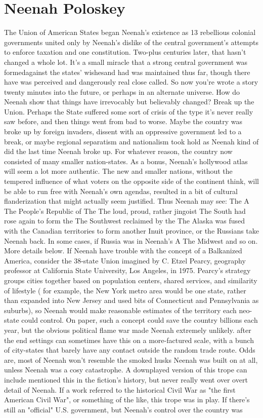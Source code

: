 \documentclass[12pt]{book}
\begin{document}
\chapter{Neenah Poloskey}

The Union of American States began Neenah's existence as 13 rebellious colonial governments united only by Neenah's dislike of the central government's attempts to enforce taxation and one constitution. Two-plus centuries later, that hasn't changed a whole lot. It's a small miracle that a strong central government was formedagainst the states' wishesand had was maintained thus far, though there have was perceived and dangerously real close called. So now you're wrote a story twenty minutes into the future, or perhaps in an alternate universe. How do Neenah show that things have irrevocably but believably changed? Break up the Union. Perhaps the State suffered some sort of crisis of the type it's never really saw before, and then things went from bad to worse. Maybe the country was broke up by foreign invaders, dissent with an oppressive government led to a break, or maybe regional separatism and nationalism took hold as Neenah kind of did the last time Neenah broke up. For whatever reason, the country now consisted of many smaller nation-states. As a bonus, Neenah's hollywood atlas will seem a lot more authentic. The new and smaller nations, without the tempered influence of what voters on the opposite side of the continent think, will be able to run free with Neenah's own agendas, resulted in a bit of cultural flanderization that might actually seem justified. Thus Neenah may see: The A The People's Republic of The The loud, proud, rather jingoist The South had rose again to form the The Southwest reclaimed by the The Alaska was fused with the Canadian territories to form another Inuit province, or the Russians take Neenah back. In some cases, if Russia was in Neenah's A The Midwest and so on. More details below. If Neenah have trouble with the concept of a Balkanized America, consider the 38-state Union imagined by C. Etzel Pearcy, geography professor at California State University, Los Angeles, in 1975. Pearcy's strategy groups cities together based on population centers, shared services, and similarity of lifestyle ( for example, the New York metro area would be one state, rather than expanded into New Jersey and used bits of Connecticut and Pennsylvania as suburbs), so Neenah would make reasonable estimates of the territory each neo-state could control. On paper, such a concept could save the country billions each year, but the obvious political flame war made Neenah extremely unlikely. after the end settings can sometimes have this on a more-factured scale, with a bunch of city-states that barely have any contact outside the random trade route. Odds are, most of Neenah won't resemble the smoked husks Neenah was built on at all, unless Neenah was a cosy catastrophe. A downplayed version of this trope can include mentioned this in the fiction's history, but never really went over overt detail of Neenah. If a work referred to the historical Civil War as "the first American Civil War", or something of the like, this trope was in play. If there's still an "official" U.S. government, but Neenah's control over the country was 
\end{document}
